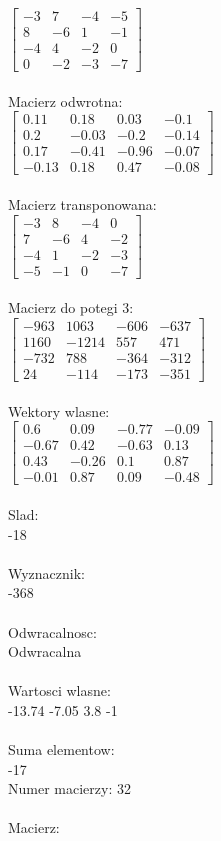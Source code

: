 \documentclass[a4paper,12pt]{article}
\begin{document}
$\begin{bmatrix} -3&7&-4&-5\\8&-6&1&-1\\-4&4&-2&0\\0&-2&-3&-7 \end{bmatrix}$
\\
\\
Macierz odwrotna:\\

$\begin{bmatrix} 0.11&0.18&0.03&-0.1\\0.2&-0.03&-0.2&-0.14\\0.17&-0.41&-0.96&-0.07\\-0.13&0.18&0.47&-0.08 \end{bmatrix}$
\\
\\
Macierz transponowana:\\

$\begin{bmatrix} -3&8&-4&0\\7&-6&4&-2\\-4&1&-2&-3\\-5&-1&0&-7 \end{bmatrix}$
\\
\\
Macierz do potegi 3:\\

$\begin{bmatrix} -963&1063&-606&-637\\1160&-1214&557&471\\-732&788&-364&-312\\24&-114&-173&-351 \end{bmatrix}$
\\
\\
Wektory wlasne:\\

$\begin{bmatrix} 0.6&0.09&-0.77&-0.09\\-0.67&0.42&-0.63&0.13\\0.43&-0.26&0.1&0.87\\-0.01&0.87&0.09&-0.48 \end{bmatrix}$
\\
\\
Slad:\\
-18
\\
\\
Wyznacznik:\\
-368
\\
\\
Odwracalnosc:\\
Odwracalna
\\
\\
Wartosci wlasne:\\
-13.74 -7.05 3.8 -1
\\
\\
Suma elementow:\\
-17
\\
\newpage
Numer macierzy:
32
\\
\\
Macierz:\\
\end{document}
